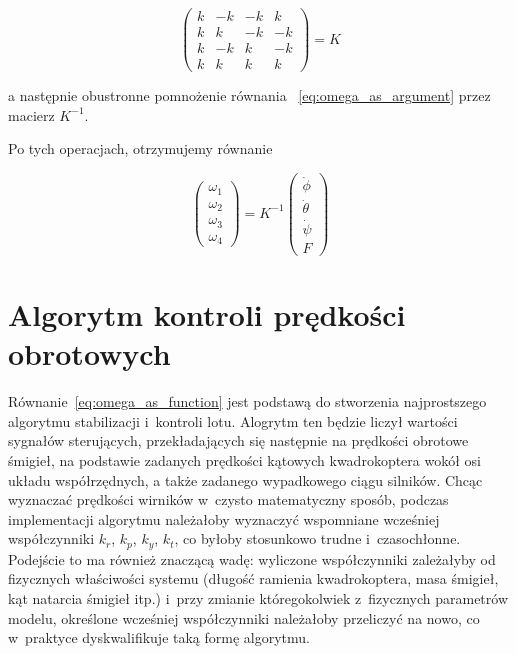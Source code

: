 \documentclass[11pt, twoside]{Thesis} %
\begin{document}
\begin{equation}
	\begin{pmatrix}
		k & -k & -k & k \\
		k & k & -k & -k \\
		k & -k & k & -k \\
		k & k & k & k
	\end{pmatrix} = K
\end{equation}

a następnie obustronne pomnożenie równania ~\ref{eq:omega_as_argument} przez macierz $K^{-1}$. 

Po tych operacjach, otrzymujemy równanie

\begin{equation}
	\label{eq:omega_as_function}
	\begin{pmatrix}
		\omega_1 \\
		\omega_2 \\
		\omega_3 \\
		\omega_4
	\end{pmatrix} = K^{-1} 
	\begin{pmatrix}
		\dot{\phi} \\
		\dot{\theta} \\
		\dot{\psi} \\
		F
	\end{pmatrix}
\end{equation}

\section{Algorytm kontroli prędkości obrotowych}

Równanie~\ref{eq:omega_as_function} jest podstawą do stworzenia najprostszego algorytmu stabilizacji i~kontroli lotu. Alogrytm ten będzie liczył wartości sygnałów sterujących, przekładających się następnie na prędkości obrotowe śmigieł, na podstawie zadanych prędkości kątowych kwadrokoptera wokół osi układu współrzędnych, a także zadanego wypadkowego ciągu silników. Chcąc wyznaczać prędkości wirników w~czysto matematyczny sposób, podczas implementacji algorytmu należałoby wyznaczyć wspomniane wcześniej współczynniki $k_r$, $k_p$, $k_y$, $k_t$, co byłoby stosunkowo trudne i~czasochłonne. Podejście to ma również znaczącą wadę: wyliczone współczynniki zależałyby od fizycznych właściwości systemu (długość ramienia kwadrokoptera, masa śmigieł, kąt natarcia śmigieł itp.) i~przy zmianie któregokolwiek z~fizycznych parametrów modelu, określone wcześniej współczynniki należałoby przeliczyć na nowo, co w~praktyce dyskwalifikuje taką formę algorytmu. 
\end{document}
